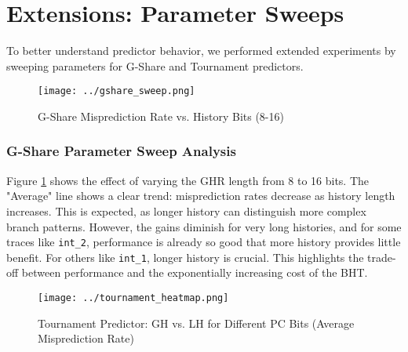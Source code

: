 \documentclass[sigconf, screen]{acmart}
\begin{document}
\section{Extensions: Parameter Sweeps}

To better understand predictor behavior, we performed extended experiments by sweeping parameters for G-Share and Tournament predictors.

\begin{figure}[H]
  \centering
  \captionsetup{font=bf,size=small}
  \texttt{[image: ../gshare\_sweep.png]}
  \caption{G-Share Misprediction Rate vs. History Bits (8-16)}
  \label{fig:gshare_sweep}
\end{figure}

\subsubsection{G-Share Parameter Sweep Analysis}
Figure \ref{fig:gshare_sweep} shows the effect of varying the GHR length from 8 to 16 bits. The "Average" line shows a clear trend: misprediction rates decrease as history length increases. This is expected, as longer history can distinguish more complex branch patterns. However, the gains diminish for very long histories, and for some traces like \texttt{int\_2}, performance is already so good that more history provides little benefit. For others like \texttt{int\_1}, longer history is crucial. This highlights the trade-off between performance and the exponentially increasing cost of the BHT.

\begin{figure*}[t]
  \centering
  \captionsetup{font=bf,size=small}
  \texttt{[image: ../tournament\_heatmap.png]}
  \caption{Tournament Predictor: GH vs. LH for Different PC Bits (Average Misprediction Rate)}
  \label{fig:tourn_heatmap}
\end{figure*}
\end{document}
